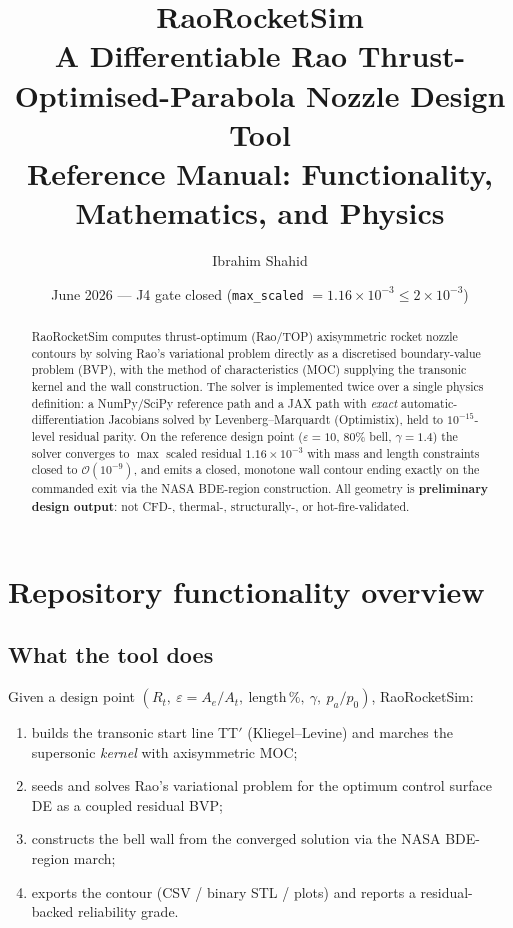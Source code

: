 \documentclass[11pt]{article}
\title{\textbf{RaoRocketSim}\\[4pt]
\large A Differentiable Rao Thrust-Optimised-Parabola Nozzle Design Tool\\
Reference Manual: Functionality, Mathematics, and Physics}
\author{Ibrahim Shahid}
\date{June 2026 --- J4 gate closed (\texttt{max\_scaled} $= 1.16\times10^{-3} \le 2\times10^{-3}$)}
\begin{document}
\maketitle

\begin{abstract}
RaoRocketSim computes thrust-optimum (Rao/TOP) axisymmetric rocket nozzle
contours by solving Rao's variational problem directly as a discretised
boundary-value problem (BVP), with the method of characteristics (MOC)
supplying the transonic kernel and the wall construction.  The solver is
implemented twice over a single physics definition: a NumPy/SciPy
reference path and a JAX path with \emph{exact} automatic-differentiation
Jacobians solved by Levenberg--Marquardt (Optimistix), held to
$10^{-15}$-level residual parity.  On the reference design point
($\varepsilon=10$, $80\%$ bell, $\gamma=1.4$) the solver converges to
$\max$ scaled residual $1.16\times10^{-3}$ with mass and length
constraints closed to $\mathcal{O}(10^{-9})$, and emits a closed,
monotone wall contour ending exactly on the commanded exit via the NASA
BDE-region construction.  All geometry is \textbf{preliminary design
output}: not CFD-, thermal-, structurally-, or hot-fire-validated.
\end{abstract}

\tableofcontents

\section{Repository functionality overview}

\subsection{What the tool does}
Given a design point $(R_t,\ \varepsilon = A_e/A_t,\ \text{length}\,\%,\
\gamma,\ p_a/p_0)$, RaoRocketSim:
\begin{enumerate}
  \item builds the transonic start line TT$'$ (Kliegel--Levine) and
        marches the supersonic \emph{kernel} with axisymmetric MOC;
  \item seeds and solves Rao's variational problem for the optimum
        control surface DE as a coupled residual BVP;
  \item constructs the bell wall from the converged solution via the
        NASA BDE-region march;
  \item exports the contour (CSV / binary STL / plots) and reports a
        residual-backed reliability grade.
\end{enumerate}
\end{document}
